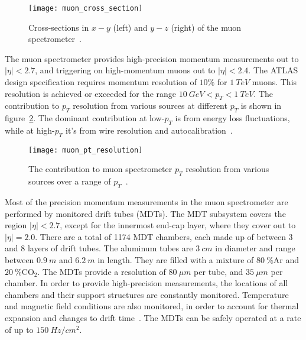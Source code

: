 \begin{figure}[!ht]\centering
\texttt{[image: muon\_cross\_section]}
\caption{Cross-sections in $x-y$ (left) and $y-z$ (right) of the muon spectrometer~\cite{muon-2003}.}
\label{fig:muon_cross_section}
\end{figure}

The muon spectrometer provides high-precision momentum measurements out to $|\eta| < 2.7$, and triggering on high-momentum muons out to $|\eta| < 2.4$.
The ATLAS design specification requires momentum resolution of $10\%$ for $1~TeV$ muons.
This resolution is achieved or exceeded for the range $10~GeV < p_T < 1~TeV$.
The contribution to $p_T$ resolution from various sources at different $p_T$ is shown in figure~\ref{fig:muon_resolution}.
The dominant contribution at low-$p_T$ is from energy loss fluctuations,
while at high-$p_T$ it's from wire resolution and autocalibration~\cite{muon-2003}.

\begin{figure}[!ht]\centering
\texttt{[image: muon\_pt\_resolution]}
\caption{The contribution to muon spectrometer $p_T$ resolution from various sources over a range of $p_T$~\cite{muon-2003}.}
\label{fig:muon_resolution}
\end{figure}

Most of the precision momentum measurements in the muon spectrometer are performed by monitored drift tubes (MDTs).
The MDT subsystem covers the region $|\eta| < 2.7$, except for the innermost end-cap layer, where they cover out to $|\eta| = 2.0$.
There are a total of 1174 MDT chambers, each made up of between 3 and 8 layers of drift tubes.
The aluminum tubes are $3~cm$ in diameter and range between $0.9~m$ and $6.2~m$ in length.
They are filled with a mixture of $80~\% \mathrm{Ar}$ and  $20~\% \mathrm{CO_2}$.
The MDTs provide a resolution of $80~\mu m$ per tube, and $35~\mu m$ per chamber.
In order to provide high-precision measurements, the locations of all chambers and their support structures are constantly monitored.
Temperature and magnetic field conditions are also monitored, in order to account for thermal expansion and changes to drift time~\cite{muon-2003}.
The MDTs can be safely operated at a rate of up to $150~Hz/cm^2$.

